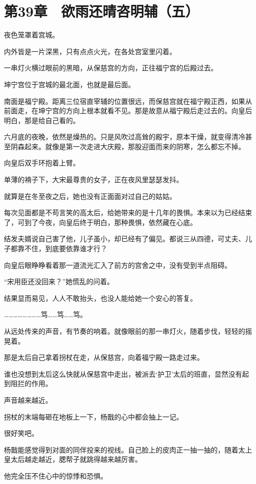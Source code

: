 \section{第39章　欲雨还晴咨明辅（五）}

夜色笼罩着宫城。

内外皆是一片深黑，只有点点火光，在各处宫室里闪着。

一串灯火横过眼前的黑暗，从保慈宫的方向，正往福宁宫的后殿过去。

坤宁宫位于宫城的最北面，也就是最后面。

南面是福宁殿。距离三位宿直宰辅的位置很远，而保慈宫就在福宁殿正西，如果从前面走，在坤宁宫的方向上根本就看不见。那是故意从福宁殿后走过去的。向皇后明白，那是给自己看的。

六月底的夜晚，依然是燥热的。只是风吹过高耸的殿宇，原本干燥，就变得清冷甚至阴森起来。就像是第一次走进大庆殿，那股迎面而来的阴寒，怎么都忘不掉。

向皇后双手环抱着上臂。

单薄的褙子下，大宋最尊贵的女子，正在夜风里瑟瑟发抖。

就算是在冬至夜之后，她也没有正面面对过自己的姑姑。

每次见面都是不苟言笑的高太后，给她带来的是十几年的畏惧。本来以为已经结束了，可到了今夜，向皇后终于明白，那种畏惧，依然藏在心底。

结发夫婿说自己害了他，儿子虽小，却已经有了偏见。都说三从四德，可丈夫、儿子都靠不住，到底要依靠谁才行？

向皇后眼睁睁看着那一道流光汇入了前方的宫舍之中，没有受到半点阻碍。

“宋用臣还没回来？”她慌乱的问着。

结果显而易见，人人不敢抬头，也没人能给她一个安心的答复。

……………………笃……笃……笃。

从远处传来的声音，有节奏的响着。就像眼前的那一串灯火，随着步伐，轻轻的摇晃着。

那是太后自己拿着拐杖在走，从保慈宫，向着福宁殿一路走过来。

谁也没想到太后这么快就从保慈宫中走出，被派去‘护卫’太后的班直，显然没有起到阻拦的作用。

声音越来越近。

拐杖的末端每砸在地板上一下，杨戬的心中都会抽上一记。

很好笑吧。

杨戬能感觉得到对面的同伴投来的视线。自己脸上的皮肉正一抽一抽的，随着太上皇太后越走越近，腮帮子就跳得越来越厉害。

他完全压不住心中的惊悸和恐惧。

